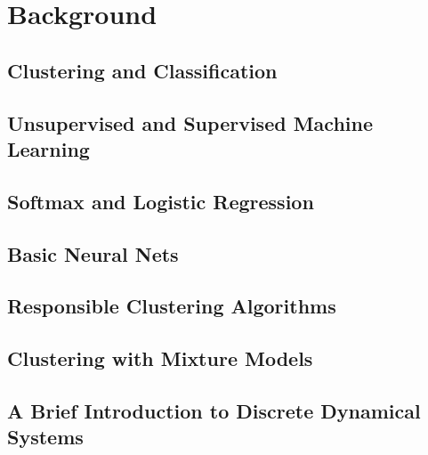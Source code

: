 %
%
\chapter{Background}\label{ch:background}
	\section{Clustering and Classification}
		
	\section{Unsupervised and Supervised Machine Learning}
		
	\section{Softmax and Logistic Regression}
		
		
	\section{Basic Neural Nets}
		
		
	\section{Responsible Clustering Algorithms}
		
		
	\section{Clustering with Mixture Models}
		
	\section{A Brief Introduction to Discrete Dynamical Systems}
		
%